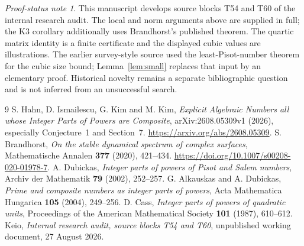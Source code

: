 \documentclass[11pt,a4paper]{article}
\theoremstyle{definition}\newtheorem{definition}[theorem]{Definition}
\theoremstyle{remark}\newtheorem{remark}[theorem]{Remark}
\newtheorem{audit}[theorem]{Proof-status note}
\begin{document}
\begin{audit}
This manuscript develops source blocks T54 and T60 of the internal research audit. The local and norm arguments above are supplied in full; the K3 corollary additionally uses Brandhorst's published theorem. The quartic matrix identity is a finite certificate and the displayed cubic values are illustrations. The earlier survey-style source used the least-Pisot-number theorem for the cubic size bound; Lemma~\ref{lem:small} replaces that input by an elementary proof. Historical novelty remains a separate bibliographic question and is not inferred from an unsuccessful search.
\end{audit}

\begin{thebibliography}{9}
S. Hahn, D. Ismailescu, G. Kim and M. Kim,
\emph{Explicit Algebraic Numbers all whose Integer Parts of Powers are Composite},
arXiv:2608.05309v1 (2026), especially Conjecture~1 and Section~7.
\url{https://arxiv.org/abs/2608.05309}.
S. Brandhorst,
\emph{On the stable dynamical spectrum of complex surfaces},
Mathematische Annalen \textbf{377} (2020), 421--434.
\url{https://doi.org/10.1007/s00208-020-01978-7}.
A. Dubickas,
\emph{Integer parts of powers of Pisot and Salem numbers},
Archiv der Mathematik \textbf{79} (2002), 252--257.
G. Alkauskas and A. Dubickas,
\emph{Prime and composite numbers as integer parts of powers},
Acta Mathematica Hungarica \textbf{105} (2004), 249--256.
D. Cass, \emph{Integer parts of powers of quadratic units},
Proceedings of the American Mathematical Society \textbf{101} (1987), 610--612.
Keio, \emph{Internal research audit, source blocks T54 and T60},
unpublished working document, 27 August 2026.
\end{thebibliography}
\end{document}
